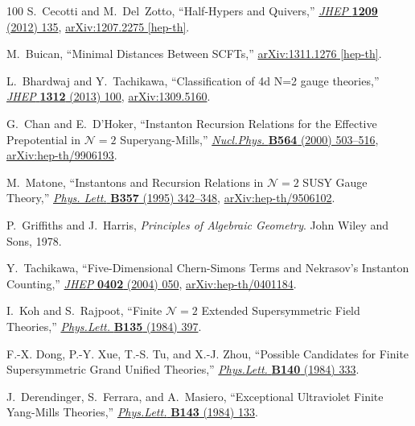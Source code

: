 \begin{thebibliography}{100}
S.~Cecotti and M.~Del~Zotto, ``{Half-Hypers and Quivers},''
\href{http://dx.doi.org/10.1007/JHEP09(2012)135}{{\em JHEP} {\bfseries 1209} (2012) 135},
\href{http://arxiv.org/abs/1207.2275}{{\ttfamily arXiv:1207.2275 [hep-th]}}.

M.~Buican, ``{Minimal Distances Between SCFTs},''
\href{http://arxiv.org/abs/1311.1276}{{\ttfamily arXiv:1311.1276 [hep-th]}}.

L.~Bhardwaj and Y.~Tachikawa, ``{Classification of 4d N=2 gauge theories},''
\href{http://dx.doi.org/10.1007/JHEP12(2013)100}{{\em JHEP} {\bfseries 1312} (2013) 100},
\href{http://arxiv.org/abs/1309.5160}{{\ttfamily arXiv:1309.5160}}.

G.~Chan and E.~D'Hoker, ``{Instanton Recursion Relations for the Effective Prepotential in ${\mathcal{N}}\!=2$ Superyang-Mills},''
\href{http://dx.doi.org/10.1016/S0550-3213(99)00638-0}{{\em Nucl.Phys.} {\bfseries B564} (2000) 503--516},
\href{http://arxiv.org/abs/hep-th/9906193}{{\ttfamily arXiv:hep-th/9906193}}.

M.~Matone, ``{Instantons and Recursion Relations in ${\mathcal{N}}\!=2$ SUSY Gauge Theory},''
\href{http://dx.doi.org/10.1016/0370-2693(95)00920-G}{{\em Phys. Lett.} {\bfseries B357} (1995) 342--348},
\href{http://arxiv.org/abs/hep-th/9506102}{{\ttfamily arXiv:hep-th/9506102}}.

P.~Griffiths and J.~Harris, {\em Principles of Algebraic Geometry}.
\newblock John Wiley and Sons, 1978.

Y.~Tachikawa, ``{Five-Dimensional Chern-Simons Terms and Nekrasov's Instanton Counting},''
\href{http://dx.doi.org/10.1088/1126-6708/2004/02/050}{{\em JHEP} {\bfseries 0402} (2004) 050},
\href{http://arxiv.org/abs/hep-th/0401184}{{\ttfamily arXiv:hep-th/0401184}}.

I.~Koh and S.~Rajpoot, ``{Finite ${\mathcal{N}}\!=2$ Extended Supersymmetric Field Theories},''
\href{http://dx.doi.org/10.1016/0370-2693(84)90302-2}{{\em Phys.Lett.} {\bfseries B135} (1984) 397}.

F.-X. Dong, P.-Y. Xue, T.-S. Tu, and X.-J. Zhou, ``{Possible Candidates for Finite Supersymmetric Grand Unified Theories},''
\href{http://dx.doi.org/10.1016/0370-2693(84)90765-2}{{\em Phys.Lett.} {\bfseries B140} (1984) 333}.

J.~Derendinger, S.~Ferrara, and A.~Masiero, ``{Exceptional Ultraviolet Finite Yang-Mills Theories},''
\href{http://dx.doi.org/10.1016/0370-2693(84)90819-0}{{\em Phys.Lett.} {\bfseries B143} (1984) 133}.


\end{thebibliography}
